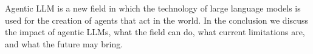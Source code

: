 Agentic LLM is a new field in which the  technology of large language models is used for the creation of agents that act in the world. In the conclusion we discuss the impact of agentic LLMs, what the field can do,  what current limitations are, and what the future may bring.
